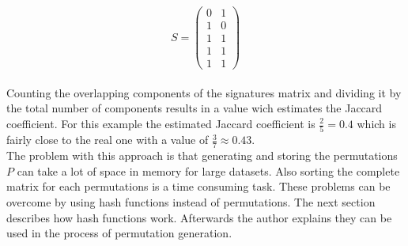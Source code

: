 \begin{equation}
    S = 
    \begin{pmatrix}
        0 & 1 \\
        1 & 0 \\
        1 & 1 \\
        1 & 1 \\
        1 & 1
    \end{pmatrix}
\end{equation} \\

Counting the overlapping components of the signatures matrix and dividing it by the total number of components results in a value wich estimates the Jaccard coefficient. For this example the estimated Jaccard coefficient is $ \frac{2}{5} = 0.4 $ which is fairly close to the real one with a value of $ \frac{3}{7} \approx 0.43 $.\\

The problem with this approach is that generating and storing the permutations $ P $ can take a lot of space in memory for large datasets. Also sorting the complete matrix for each permutations is a time consuming task. These problems can be overcome by using hash functions instead of permutations. The next section describes how hash functions work. Afterwards the author explains they can be used in the process of permutation generation.\\

